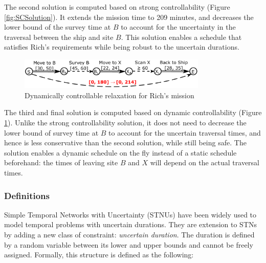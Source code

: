 \documentclass[jair,twoside,11pt,theapa]{article}
\begin{document}
The second solution is computed based on strong controllability (Figure
\ref{fig:SCSolution}). It extends the mission time to 209 minutes, and decreases
the lower bound of the survey time at $B$ to account for the uncertainty in
the traversal between the ship and site $B$. This solution enables a schedule that satisfies Rich's requirements while being robust to
the uncertain durations.

\begin{figure}[ht!]
	\centering
	\includegraphics[width=0.8\textwidth]{figures/solution_dc.pdf} 
	\caption{Dynamically controllable relaxation for Rich's mission}
	\label{fig:DCSolution}
\end{figure}

The third and final solution is computed based on dynamic controllability
(Figure \ref{fig:DCSolution}). Unlike the strong controllability solution, it
does not need to decrease the lower bound of survey time at $B$ to account for
the uncertain traversal times, and hence is less conservative than the second
solution, while still being safe. The solution enables a dynamic schedule on the fly instead of a static schedule beforehand:
the times of leaving site $B$ and $X$ will depend on the actual traversal times.


\subsubsection{Definitions}

Simple Temporal Networks with Uncertainty (STNUs)
\cite<STNUs,>{Vidal99handlingcontingency} have been widely used to model temporal
problems with uncertain durations. They are extension to STNs by adding a new
class of constraint: \textit{uncertain duration}. The duration is defined by a
random variable between its lower and upper bounds and cannot be freely
assigned. Formally, this structure is defined as the following:
\end{document}

